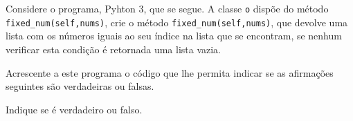 \documentclass[12pt,varwidth=16cm,border=1pt]{standalone}
\begin{document}
Considere o programa, Pyhton 3, que se segue. A classe \verb+o+ dispõe do método \verb+fixed_num(self,nums)+, crie o método \verb+fixed_num(self,nums)+, que devolve uma lista com os números iguais ao seu índice na lista que se encontram, se nenhum verificar esta condição é retornada uma lista vazia.



Acrescente a este programa o código que lhe permita indicar se as
afirmações seguintes são verdadeiras ou falsas.

Indique se é verdadeiro ou falso.
\end{document}
